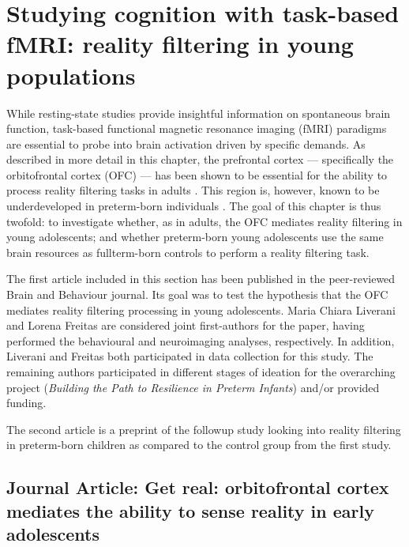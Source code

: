 \chapter{Studying cognition with task-based fMRI: reality filtering in young populations}\label{chapter:ch4}


\vspace{2cm}

While resting-state studies provide insightful information on spontaneous brain function, task-based functional magnetic resonance imaging (fMRI) paradigms are essential to probe into brain activation driven by specific demands. As described in more detail in this chapter, the prefrontal cortex --- specifically the orbitofrontal cortex (OFC) --- has been shown to be essential for the ability to process reality filtering tasks in adults \citep{Schnider2018}. This region is, however, known to be underdeveloped in preterm-born individuals \citep{Thompson2007}. The goal of this chapter is thus twofold: to investigate whether, as in adults, the OFC mediates reality filtering in young adolescents; and whether preterm-born young adolescents use the same brain resources as fullterm-born controls to perform a reality filtering task.  


The first article included in this section has been published in the peer-reviewed Brain and Behaviour journal. Its goal was to test the hypothesis that the OFC mediates reality filtering processing in young adolescents. Maria Chiara Liverani and Lorena Freitas are considered joint first-authors for the paper, having performed the behavioural and neuroimaging analyses, respectively. In addition, Liverani and Freitas both participated in data collection for this study. The remaining authors participated in different stages of ideation for the overarching project (\textit{Building the Path to Resilience in Preterm Infants}) and/or provided funding. 

The second article is a preprint of the followup study looking into reality filtering in preterm-born children as compared to the control group from the first study. 

\clearpage

\section{Journal Article:  Get real: orbitofrontal cortex mediates the ability to sense reality in early adolescents} \label{section:ch4_orfi_ctrl}

